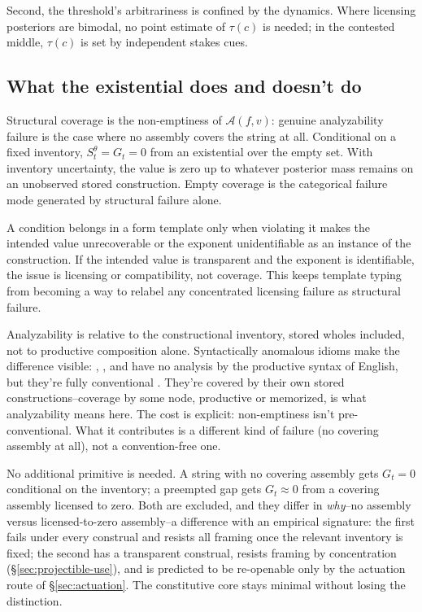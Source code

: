 Second, the threshold's arbitrariness is confined by the dynamics. Where
licensing posteriors are bimodal, no point estimate of $\tau(c)$ is needed; in
the contested middle, $\tau(c)$ is set by independent stakes cues.

\subsection{What the existential does and doesn't do}
\label{sec:existential}
\label{sec:map-clarification}

Structural coverage is the non-emptiness of $\mathcal{A}(f,v)$: genuine
analyzability failure is the case where no assembly covers the string at all.
Conditional on a fixed inventory, $S_t^{\theta}=G_t=0$ from an existential over
the empty set. With inventory uncertainty, the value is zero up to whatever
posterior mass remains on an unobserved stored construction. Empty coverage is
the categorical failure mode generated by structural failure alone.

A condition belongs in a form template only when violating it makes the intended
value unrecoverable or the exponent unidentifiable as an instance of the
construction. If the intended value is transparent and the exponent is
identifiable, the issue is licensing or compatibility, not coverage. This keeps
template typing from becoming a way to relabel any concentrated licensing
failure as structural failure.

Analyzability is relative to the constructional inventory, stored wholes included, not to productive composition alone. Syntactically anomalous idioms make the difference visible: , , and  have no analysis by the productive syntax of English, but they're fully conventional \parencite{fillmore1988}. They're covered by their own stored constructions--coverage by some node, productive or memorized, is what analyzability means here. The cost is explicit: non-emptiness isn't pre-conventional. What it contributes is a different kind of failure (no covering assembly at all), not a convention-free one.

No additional primitive is needed. A string with no covering assembly gets
$G_t=0$ conditional on the inventory; a preempted gap gets $G_t\approx0$ from a
covering assembly licensed to zero. Both are excluded, and they differ in
\emph{why}--no assembly versus licensed-to-zero assembly--a difference with an
empirical signature: the first fails under every construal and resists all
framing once the relevant inventory is fixed; the second has a transparent
construal, resists framing by concentration (\S\ref{sec:projectible-use}), and
is predicted to be re-openable only by the actuation route of
\S\ref{sec:actuation}. The constitutive core stays minimal without losing the
distinction.

